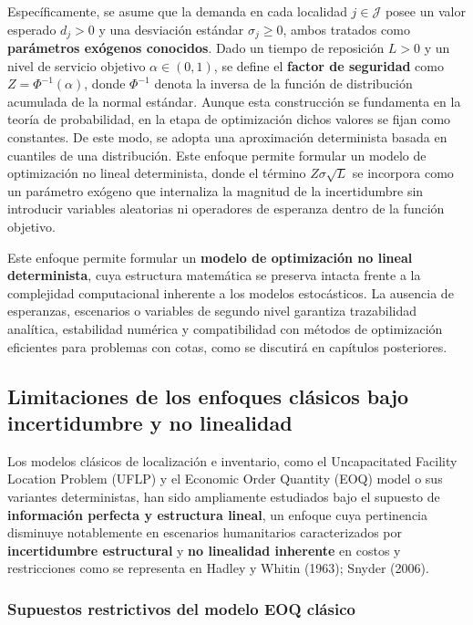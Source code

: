 \documentclass[
  spanish,
  us-letterpaper,
]{scrreprt}
\numberwithin{equation}{section}
\begin{document}
Específicamente, se asume que la demanda en cada localidad
\(j\in\mathcal{J}\) posee un valor esperado \(d_j>0\) y una desviación
estándar \(\sigma_j\geq0\), ambos tratados como \textbf{parámetros
exógenos conocidos}. Dado un tiempo de reposición \(L>0\) y un nivel de
servicio objetivo \(\alpha\in(0,1)\), se define el \textbf{factor de
seguridad} como \(Z=\Phi^{-1}(\alpha)\), donde \(\Phi^{-1}\) denota la
inversa de la función de distribución acumulada de la normal estándar.
Aunque esta construcción se fundamenta en la teoría de probabilidad, en
la etapa de optimización dichos valores se fijan como constantes. De
este modo, se adopta una aproximación determinista basada en cuantiles
de una distribución. Este enfoque permite formular un modelo de
optimización no lineal determinista, donde el término
\(Z\sigma\sqrt{L}\) se incorpora como un parámetro exógeno que
internaliza la magnitud de la incertidumbre sin introducir variables
aleatorias ni operadores de esperanza dentro de la función objetivo.

Este enfoque permite formular un \textbf{modelo de optimización no
lineal determinista}, cuya estructura matemática se preserva intacta
frente a la complejidad computacional inherente a los modelos
estocásticos. La ausencia de esperanzas, escenarios o variables de
segundo nivel garantiza trazabilidad analítica, estabilidad numérica y
compatibilidad con métodos de optimización eficientes para problemas con
cotas, como se discutirá en capítulos posteriores.

\subsection{Limitaciones de los enfoques clásicos bajo incertidumbre y
no linealidad}\label{sec-Nolinealidad}

Los modelos clásicos de localización e inventario, como el Uncapacitated
Facility Location Problem (UFLP) y el Economic Order Quantity (EOQ)
model o sus variantes deterministas, han sido ampliamente estudiados
bajo el supuesto de \textbf{información perfecta y estructura lineal},
un enfoque cuya pertinencia disminuye notablemente en escenarios
humanitarios caracterizados por \textbf{incertidumbre estructural} y
\textbf{no linealidad inherente} en costos y restricciones como se
representa en Hadley y Whitin (1963); Snyder (2006).

\subsubsection{Supuestos restrictivos del modelo EOQ
clásico}\label{supuestos-restrictivos-del-modelo-eoq-cluxe1sico}
\end{document}

